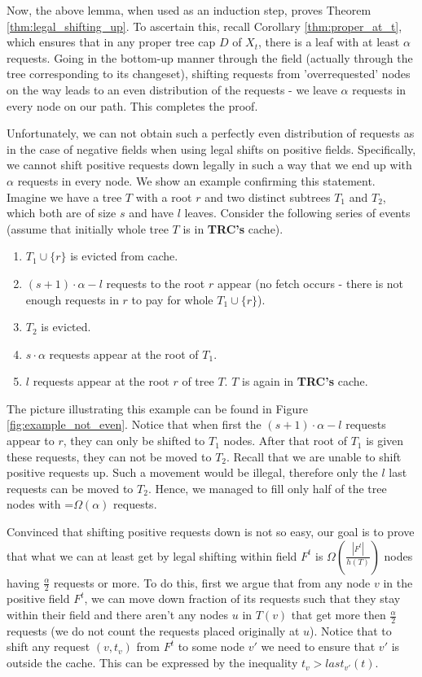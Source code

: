 Now, the above lemma, when used as an induction step, proves Theorem
\ref{thm:legal_shifting_up}. To ascertain this, recall Corollary
\ref{thm:proper_at_t}, which ensures that in any proper tree cap $D$ of $X_t$,
there is a leaf with at least $\alpha$ requests. Going in the bottom-up manner
through the field (actually through the tree corresponding to its changeset), shifting 
requests from 'overrequested' nodes on the way leads to an even distribution of the requests 
- we leave $\alpha$ requests in every node on our path. This completes the proof.


Unfortunately, we can not obtain such a perfectly even distribution of requests as 
in the case of negative fields when using legal shifts on positive fields.
Specifically, we cannot shift positive requests down legally in such a way that
we end up with $\alpha$ requests in every node. We show an example confirming
this statement. Imagine we have a tree $T$ with a root $r$ and two distinct
subtrees $T_1$ and $T_2$, which both are of size $s$ and have $l$ leaves.
Consider the following series of events (assume that initially whole tree $T$
is in \textbf{TRC's} cache).  \begin{enumerate} \item $T_1 \cup \{r\}$ is
evicted from cache.  \item $(s+1) \cdot \alpha - l$ requests to the root $r$
appear (no fetch occurs - there is not enough requests in $r$ to pay for whole
$T_1 \cup \{r\}$).  \item $T_2$ is evicted.  \item $s \cdot \alpha$ requests
appear at the root of $T_1$.  \item $l$ requests appear at the root $r$ of tree
$T$. $T$ is again in \textbf{TRC's} cache.  \end{enumerate}

The picture illustrating this example can be found in Figure
\ref{fig:example_not_even}. 
Notice that when first the $(s+1) \cdot \alpha - l$
requests appear to $r$, they can only be shifted to $T_1$ nodes. After that root
of $T_1$ is given these requests, they can not be moved to $T_2$. Recall that we are
unable to shift positive requests up. Such a movement would be illegal,
therefore only the $l$ last requests can be moved to $T_2$. Hence, we managed to fill
only half of the tree nodes with =$\Omega(\alpha)$ requests.   

Convinced that shifting positive requests down is not so easy, our goal is to
prove that what we can at least get by legal shifting within field $F^t$ is
$\Omega(\frac{|F^t|}{h(T)})$ nodes having $\frac{\alpha}{2}$ requests or more.
To do this, first we argue that from any node $v$ in the positive field $F^t$, we
can move down fraction of its requests such that they stay within their field and there
aren't any nodes $u$ in $T(v)$ that get more then $\frac{\alpha}{2}$ requests
(we do not count the requests placed originally at $u$). Notice that to shift
any request $(v, t_v)$ from $F^t$ to some node $v'$ we need to ensure that $v'$
is outside the cache. This can be expressed by the inequality $t_v > last_{v'}(t)$.

